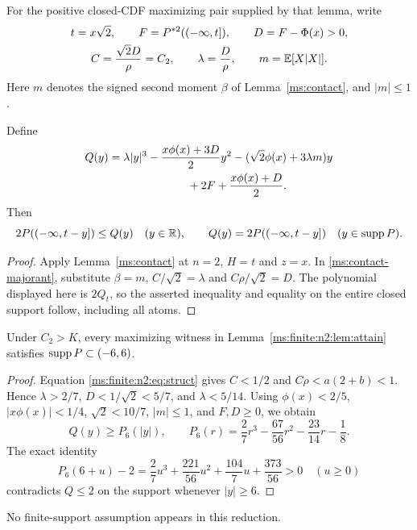 For the positive closed-CDF maximizing pair supplied by that lemma, write
\[
 \begin{gathered}
 t=x\sqrt2,\qquad F=P^{*2}(( -\infty,t]),\qquad D=F-\Phi(x)>0,\\
 C=\frac{\sqrt2D}{\rho}=C_2,\qquad
 \lambda=\frac D\rho,\qquad m=\mathbb E[X|X|].
 \end{gathered}
\]
Here $m$ denotes the signed second moment $\beta$ of
Lemma~\ref{ms:contact}, and $|m|\le1$.

\begin{lemma}\label{ms:finite:n2:lem:contact}
Define
\begin{align}
 Q(y)={}&\lambda|y|^3-\frac{x\phi(x)+3D}{2}y^2
       -(\sqrt2\phi(x)+3\lambda m)y\notag\\
       &\hspace{20mm}+2F+\frac{x\phi(x)+D}{2}.\label{ms:finite:n2:eq:Q}
\end{align}
Then
\begin{equation}\label{ms:finite:n2:eq:contact}
 2P(( -\infty,t-y])\le Q(y)\quad(y\in\mathbb R),
 \qquad Q(y)=2P(( -\infty,t-y])\quad(y\in\operatorname{supp} P).
\end{equation}
\end{lemma}
\begin{proof}
Apply Lemma~\ref{ms:contact} at $n=2$, $H=t$ and $z=x$.
In \eqref{ms:contact-majorant}, substitute $\beta=m$,
$C/\sqrt2=\lambda$ and $C\rho/\sqrt2=D$. The polynomial displayed
here is $2Q_t$, so the asserted inequality and equality on the entire
closed support follow, including all atoms.
\end{proof}

\begin{lemma}\label{ms:finite:n2:lem:support}
Under $C_2>K$, every maximizing witness in Lemma~\ref{ms:finite:n2:lem:attain} satisfies
$\operatorname{supp} P\subset(-6,6)$.
\end{lemma}
\begin{proof}
Equation \eqref{ms:finite:n2:eq:struct} gives $C<1/2$ and $C\rho<a(2+b)<1$.
Hence $\lambda>2/7$, $D<1/\sqrt2<5/7$, and $\lambda<5/14$.
Using $\phi(x)<2/5$, $|x\phi(x)|<1/4$, $\sqrt2<10/7$,
$|m|\le1$, and $F,D\ge0$, we obtain
\[
 Q(y)\ge P_6(|y|),\qquad
 P_6(r)=\frac27r^3-\frac{67}{56}r^2-\frac{23}{14}r-\frac18.
\]
The exact identity
\[
 P_6(6+u)-2
 =\frac27u^3+\frac{221}{56}u^2+\frac{104}{7}u+\frac{373}{56}>0
 \quad(u\ge0)
\]
contradicts $Q\le2$ on the support whenever $|y|\ge6$.
\end{proof}
No finite-support assumption appears in this reduction.

